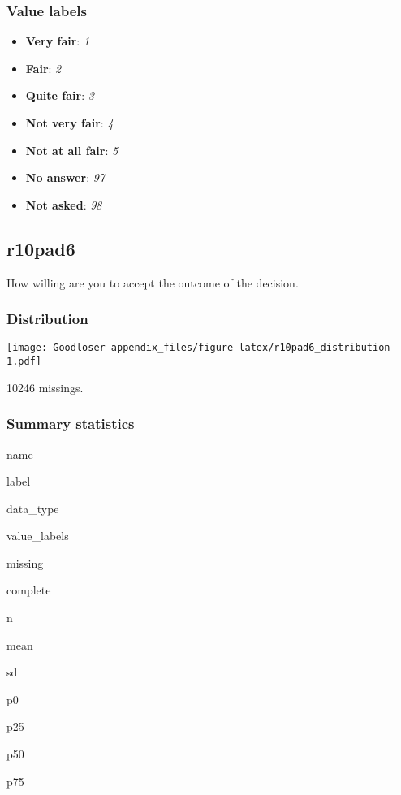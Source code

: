 \documentclass[]{book}
\providecommand{\tightlist}{%
  \setlength{\itemsep}{0pt}\setlength{\parskip}{0pt}}
\begin{document}
\subsubsection{Value labels}\label{r10pad5_labels}

\begin{itemize}
\tightlist
\item
  \textbf{Very fair}: \emph{1}
\item
  \textbf{Fair}: \emph{2}
\item
  \textbf{Quite fair}: \emph{3}
\item
  \textbf{Not very fair}: \emph{4}
\item
  \textbf{Not at all fair}: \emph{5}
\item
  \textbf{No answer}: \emph{97}
\item
  \textbf{Not asked}: \emph{98}
\end{itemize}

\subsection{r10pad6}\label{r10pad6}

How willing are you to accept the outcome of the decision.

\subsubsection{Distribution}\label{r10pad6_distribution}

\texttt{[image: Goodloser-appendix\_files/figure-latex/r10pad6\_distribution-1.pdf]}

10246 missings.

\subsubsection{Summary statistics}\label{r10pad6_summary}

name

label

data\_type

value\_labels

missing

complete

n

mean

sd

p0

p25

p50

p75
\end{document}
